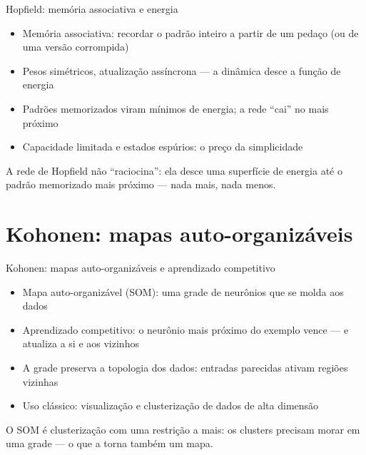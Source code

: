 \documentclass[aspectratio=169, 11pt]{beamer}
\begin{document}
\begin{frame}{Hopfield: memória associativa e energia}
  \begin{itemize}\setlength{\itemsep}{0.4ex}
    \item Memória associativa: recordar o padrão inteiro a partir de um
          pedaço (ou de uma versão corrompida)
    \item Pesos simétricos, atualização assíncrona — a dinâmica desce a
          função de energia
    \item Padrões memorizados viram mínimos de energia; a rede ``cai'' no
          mais próximo
    \item Capacidade limitada e estados espúrios: o preço da simplicidade
  \end{itemize}
  \begin{alertabox}
    A rede de Hopfield não ``raciocina'': ela desce uma superfície de energia
    até o padrão memorizado mais próximo — nada mais, nada menos.
  \end{alertabox}
\end{frame}

\section{Kohonen: mapas auto-organizáveis}

\begin{frame}{Kohonen: mapas auto-organizáveis e aprendizado competitivo}
  \begin{itemize}\setlength{\itemsep}{0.4ex}
    \item Mapa auto-organizável (SOM): uma grade de neurônios que se molda
          aos dados
    \item Aprendizado competitivo: o neurônio mais próximo do exemplo vence —
          e atualiza a si e aos vizinhos
    \item A grade preserva a topologia dos dados: entradas parecidas ativam
          regiões vizinhas
    \item Uso clássico: visualização e clusterização de dados de alta
          dimensão
  \end{itemize}
  \begin{ideiabox}
    O SOM é clusterização com uma restrição a mais: os clusters precisam
    morar em uma grade — o que a torna também um mapa.
  \end{ideiabox}
\end{frame}
\end{document}
